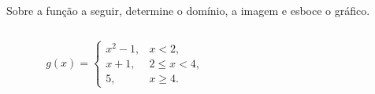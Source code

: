 \begin{frame}
  \begin{example}
    Sobre a função a seguir, determine o domínio, a imagem e esboce o gráfico.
  \end{example}
  \begin{columns}[onlytextwidth]
    \begin{column}{0.35\textwidth}
      \begin{equation*}
        g(x) = \begin{cases}
          x^{2} - 1, & x < 2 ,\\
          x + 1, & 2 \leq x < 4 ,\\
          5, & x \geq 4.
        \end{cases}
      \end{equation*}
    \end{column}
    \begin{column}{0.49\textwidth}\vspace*{-0.2cm}
      \begin{figure}
      \end{figure}
    \end{column}
  \end{columns}
\end{frame}

